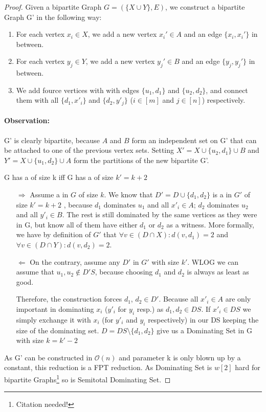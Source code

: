 \begin{proof}
    Given a bipartite Graph $G = ( \{X \cup Y\}, E)$, we construct a bipartite Graph G' in the following way:
    \begin{enumerate}
        \item For each vertex $x_i \in X$, we add a new vertex $x_i' \in A$  and an edge $\{x_i, x_i'\}$ in between. 
        \item For each vertex $y_j \in Y$, we add a new vertex $y_j' \in B$ and an edge $\{y_j, y_j'\}$ in between.
        \item We add fource vertices with with edges $\{u_1, d_1\}$ and $\{u_2, d_2\}$, and connect them with all $\{d_1, x'_i\}$ and $\{d_2, y'_j\}$ ($i \in [m]$ and $j \in [n]$) respectively.
    \end{enumerate}
    \paragraph*{Observation:} G' is clearly bipartite, because $A$ and $B$ form an independent set on G' that can be attached to one of the previous vertex sets. Setting  $X' = X \cup \{u_2,d_1\} \cup B$ and $Y' = X \cup \{u_1,d_2\} \cup A$ form the partitions of the new bipartite G'.

    \begin{corollary} G has a \sdom of size k iff G has a \sdom of size $k' = k + 2$
    \end{corollary} 
    \begin{enumerate}

    \item[$\Rightarrow$] Assume a \sdom in $G$ of size $k$. We know that $D' = D\cup \{d_1,d_2\}$ is a \sdom in $G'$ of size $k' = k+2$ , because $d_1$ dominates $u_1$ and all $x'_i \in A$; $d_2$ dominates $u_2$ and all $y'_i \in B$. The rest is still dominated by the same vertices as they were in G, but know all of them have either $d_1$ or $d_2$ as a witness.
        More formally, we have by definition of $G'$ that $\forall v \in (D \cap X): d(v, d_1) = 2$ and $\forall v \in (D \cap Y): d(v, d_2) = 2$.

    \item[$\Leftarrow$] On the contrary, assume any \sdom $D'$ in $G'$ with size $k'$. WLOG we can assume that $u_1, u_2 \notin D'S$, because choosing $d_1$ and $d_2$ is always as least as good.
    
    Therefore, the construction forces $d_1$, $d_2 \in D'$. Because all $x'_i \in A$ are only important in dominating $x_i$ ($y'_i$ for $y_i$ resp.) as $d_1, d_2 \in DS$. If $x'_i \in DS$ we simply exchange it with $x_i$ (for $y'_i$ and $y_i$ respectively) in our DS keeping the size of the dominating set. $D = DS \setminus \{ d_1,d_2\}$ give us a Dominating Set in G with size $ k = k' - 2$
    \end{enumerate}
    As G' can be constructed in $\mathcal{O}(n)$ and parameter k is only blown up by a constant, this reduction is a FPT reduction. As Dominating Set is $w[2]$ hard for bipartite Graphs\footnote{Citation needed!} so is Semitotal Dominating Set.
\end{proof}

